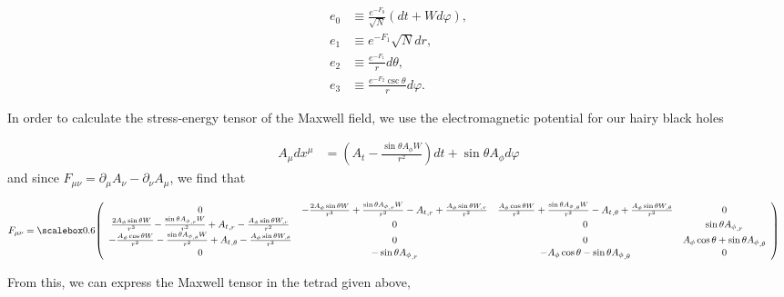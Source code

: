 \documentclass[a4paper]{article}
\begin{document}
\begin{align*}
	 e_0 &\equiv \frac{e^{-{F_0}}}{\sqrt{N}}(dt+Wd\varphi), \\
	 e_1 &\equiv  e^{-{F_1}} \sqrt{N}dr, \\
	 e_2 &\equiv \frac{e^{-{F_1}}}{r}d\theta, \\
	 e_3 &\equiv \frac{e^{-{F_2}} \csc \theta}{r}d\varphi.
\end{align*}

In order to calculate the stress-energy tensor of the Maxwell field, we use the electromagnetic potential for our hairy black holes

\begin{align*}
	A_\mu dx^\mu &= \left({A_t}-\frac{\sin \theta {A_\phi} W}{r^2}\right) dt + \sin\theta {A_\phi}d\varphi
\end{align*}
and since $F_{\mu\nu}=\partial_\mu A_\nu - \partial_\nu A_\mu$, we find that

\begin{align*}
  F_{\mu\nu} &= 
  \scalemath{0.6}{
  \left(
\begin{array}{cccc}
 0 & -\frac{2 {A_\phi} \sin \theta W}{r^3}+\frac{\sin \theta {A_\phi}_{,r} W}{r^2}-{A_t}_{,r}+\frac{{A_\phi} \sin \theta W_{,r}}{r^2} &
   \frac{{A_\phi} \cos \theta W}{r^2}+\frac{\sin \theta {A_\phi}_{,\theta} W}{r^2}-{A_t}_{,\theta}+\frac{{A_\phi} \sin \theta W_{,\theta}}{r^2} & 0 \\
 \frac{2 {A_\phi} \sin \theta W}{r^3}-\frac{\sin \theta {A_\phi}_{,r} W}{r^2}+{A_t}_{,r}-\frac{{A_\phi} \sin \theta W_{,r}}{r^2} & 0 & 0 & \sin \theta
   {A_\phi}_{,r} \\
 -\frac{{A_\phi} \cos \theta W}{r^2}-\frac{\sin \theta {A_\phi}_{,\theta} W}{r^2}+{A_t}_{,\theta}-\frac{{A_\phi} \sin \theta W_{,\theta}}{r^2} & 0 & 0 &
   {A_\phi} \cos \theta+\sin \theta {A_\phi}_{,\theta} \\
 0 & -\sin \theta {A_\phi}_{,r} & -{A_\phi} \cos \theta-\sin \theta {A_\phi}_{,\theta} & 0 
\end{array}
\right)}
\end{align*}

From this, we can express the Maxwell tensor in the tetrad given above,
\end{document}
